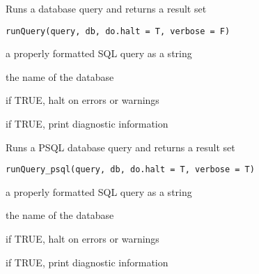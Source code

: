 \documentclass[letterpaper]{book}
\begin{document}
%
\begin{Description}\relax
Runs a database query and returns a result set
\end{Description}
%
\begin{Usage}
\begin{verbatim}
runQuery(query, db, do.halt = T, verbose = F)
\end{verbatim}
\end{Usage}
%
\begin{Arguments}
\begin{ldescription}
\item[\code{query}] a properly formatted SQL query as a string

\item[\code{db}] the name of the database

\item[\code{do.halt}] if TRUE, halt on errors or warnings

\item[\code{verbose}] if TRUE, print diagnostic information
\end{ldescription}
\end{Arguments}
%
\begin{Description}\relax
Runs a PSQL database query and returns a result set
\end{Description}
%
\begin{Usage}
\begin{verbatim}
runQuery_psql(query, db, do.halt = T, verbose = T)
\end{verbatim}
\end{Usage}
%
\begin{Arguments}
\begin{ldescription}
\item[\code{query}] a properly formatted SQL query as a string

\item[\code{db}] the name of the database

\item[\code{do.halt}] if TRUE, halt on errors or warnings

\item[\code{verbose}] if TRUE, print diagnostic information
\end{ldescription}
\end{Arguments}
\end{document}
